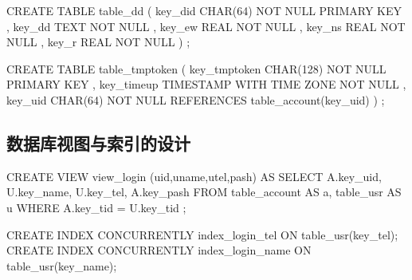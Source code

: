 \begin{sql}[caption=创建可代收表 table\_dd]
    CREATE TABLE table_dd
        ( key_did CHAR(64) NOT NULL PRIMARY KEY
        , key_dd TEXT NOT NULL
        , key_ew REAL NOT NULL
        , key_ns REAL NOT NULL
        , key_r REAL NOT NULL
        )
    ;
\end{sql}

\begin{sql}[caption=创建用户临时Token表 table\_tmptoken]
    CREATE TABLE table_tmptoken
        ( key_tmptoken CHAR(128) NOT NULL PRIMARY KEY
        , key_timeup TIMESTAMP WITH TIME ZONE NOT NULL
        , key_uid CHAR(64) NOT NULL REFERENCES table_account(key_uid)
        )
    ;
\end{sql}
\subsection{数据库视图与索引的设计}
\begin{sql}[caption=创建登陆视图 view_login]
	CREATE VIEW view_login (uid,uname,utel,pash) AS
		SELECT A.key_uid, U.key_name, U.key_tel, A.key_pash
		FROM table_account AS a, table_usr AS u
		WHERE A.key_tid = U.key_tid
	;
\end{sql}
\begin{sql}[caption=创建登陆用的索引]
	CREATE INDEX CONCURRENTLY index_login_tel ON table_usr(key_tel);
	CREATE INDEX CONCURRENTLY index_login_name ON table_usr(key_name);
\end{sql}
\begin{sql}[caption=创建]
\end{sql}

